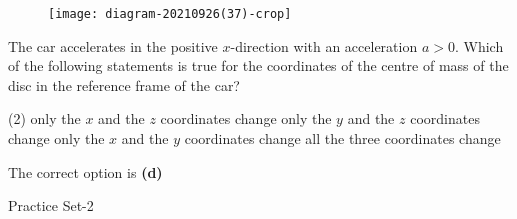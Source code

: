\begin{enumerate}
\begin{minipage}{\textwidth}
	\begin{figure}[H]
		\centering
		\texttt{[image: diagram-20210926(37)-crop]}
	\end{figure}
	The car accelerates in the positive $x$-direction with an acceleration $a>0 .$ Which of the following statements is true for the coordinates of the centre of mass of the disc in the reference frame of the car?
\end{minipage}
\begin{tasks}(2)
	\task[\textbf{A.}] only the $x$ and the $z$ coordinates change
	\task[\textbf{B.}]only the $y$ and the $z$ coordinates change
	\task[\textbf{C.}]only the $x$ and the $y$ coordinates change
	\task[\textbf{D.}]all the three coordinates change
\end{tasks}
\begin{answer}
The correct option is \textbf{(d)}	
\end{answer}
\end{enumerate}
\newpage
\begin{abox}
	Practice Set-2
	\end{abox}
